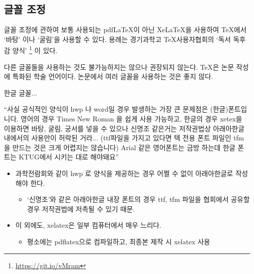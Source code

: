 \documentclass[12pt]{beamer}
\begin{document}
\subsection{글꼴 조정}
\begin{frame}{글꼴 조정에 관하여}
	보통 사용되는 pdf\LaTeX 이 아닌 Xe\LaTeX 을 사용하여 \TeX 에서 `바탕' 이나 `굴림'을 사용할 수 있다. 용례는 경기과학고 \TeX 사용자협회의 `독서 독후감 양식' \footnote{\url{https://git.io/vMram}} 이 있다. 
	\vspace{1cm}
	
	다른 글꼴들을 사용하는 것도 불가능하지는 않으나 권장되지 않는다. \TeX 은 논문 작성에 특화된 학술 언어이다. 논문에서 여러 글꼴을 사용하는 것은 좋지 않다.
\end{frame}
\begin{frame}{한글 글꼴...}
	\begin{scriptsize}
		``사실 공식적인 양식이 hwp 나 word일 경우 발생하는 가장 큰 문제점은 (한글)폰트입니다. 영어의 경우 Times New Roman 을 쉽게 사용 가능하고, 한글의 경우 xetex을 이용하면 바탕, 굴림, 궁서를 넣을 수 있으나 신명조 같은거는 저작권법상 아래아한글 내에서의 사용만이 허락된 거라... (ttf파일을 가지고 있다면 텍 전용 폰트 파일인 tfm을 만드는 것은 크게 어렵지는 않습니다)  Arial 같은 영어폰트는 금방 하는데 한글 폰트는 KTUG에서 시키는 대로 해야돼요'' %
	\end{scriptsize}
	\small
	\begin{itemize}
		\item 과학전람회와 같이 hwp 로 양식을 제공하는 경우 어쩔 수 없이 아래아한글로 작성해야 한다.
		\begin{itemize}
			\item `신명조'와 같은 아래아한글 내장 폰트의 경우 ttf, tfm 파일을 협회에서 공유할 경우 저작권법에 저촉될 수 있기 때문.
		\end{itemize}
		\item 이 외에도, xelatex은 일부 컴퓨터에서 매우 느리다.
		\begin{itemize}
			\item 평소에는 pdflatex으로 컴파일하고, 최종본 제작 시 xelatex 사용
		\end{itemize}
	\end{itemize}
\end{frame}
\end{document}
